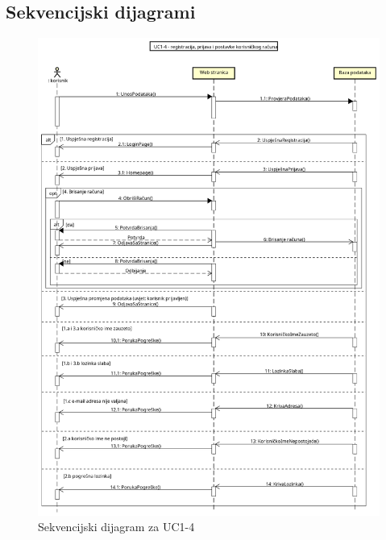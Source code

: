 			\subsection{Sekvencijski dijagrami}
				
				\begin{figure}[H]
					\centering
					\includegraphics[width=0.9\linewidth]{"slike/dijagrami/Seq 1-4"}
					\caption{Sekvencijski dijagram za UC1-4}
					\label{fig:seq-1-4}
				\end{figure}
				
